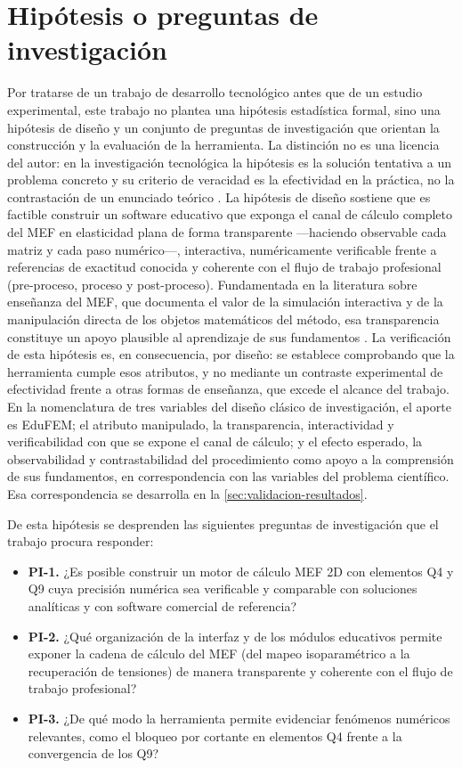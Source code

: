 \section*{Hipótesis o preguntas de investigación}

Por tratarse de un trabajo de desarrollo tecnológico antes que de un estudio experimental, este trabajo no plantea una hipótesis estadística formal, sino una hipótesis de diseño y un conjunto de preguntas de investigación que orientan la construcción y la evaluación de la herramienta. La distinción no es una licencia del autor: en la investigación tecnológica la hipótesis es la solución tentativa a un problema concreto y su criterio de veracidad es la efectividad en la práctica, no la contrastación de un enunciado teórico \autocite{garciacordoba2005tecnologica}. La hipótesis de diseño sostiene que es factible construir un software educativo que exponga el canal de cálculo completo del MEF en elasticidad plana de forma transparente —haciendo observable cada matriz y cada paso numérico—, interactiva, numéricamente verificable frente a referencias de exactitud conocida y coherente con el flujo de trabajo profesional (pre-proceso, proceso y post-proceso). Fundamentada en la literatura sobre enseñanza del MEF, que documenta el valor de la simulación interactiva y de la manipulación directa de los objetos matemáticos del método, esa transparencia constituye un apoyo plausible al aprendizaje de sus fundamentos \autocite{lee2015interactive,bishay2020teaching,perezsantiago2023fem}. La verificación de esta hipótesis es, en consecuencia, por diseño: se establece comprobando que la herramienta cumple esos atributos, y no mediante un contraste experimental de efectividad frente a otras formas de enseñanza, que excede el alcance del trabajo. En la nomenclatura de tres variables del diseño clásico de investigación, el aporte es EduFEM; el atributo manipulado, la transparencia, interactividad y verificabilidad con que se expone el canal de cálculo; y el efecto esperado, la observabilidad y contrastabilidad del procedimiento como apoyo a la comprensión de sus fundamentos, en correspondencia con las variables del problema científico. Esa correspondencia se desarrolla en la \autoref{sec:validacion-resultados}.

De esta hipótesis se desprenden las siguientes preguntas de investigación que el trabajo procura responder:

\begin{itemize}
    \item \textbf{PI-1.} ¿Es posible construir un motor de cálculo MEF 2D con elementos Q4 y Q9 cuya precisión numérica sea verificable y comparable con soluciones analíticas y con software comercial de referencia?
    \item \textbf{PI-2.} ¿Qué organización de la interfaz y de los módulos educativos permite exponer la cadena de cálculo del MEF (del mapeo isoparamétrico a la recuperación de tensiones) de manera transparente y coherente con el flujo de trabajo profesional?
    \item \textbf{PI-3.} ¿De qué modo la herramienta permite evidenciar fenómenos numéricos relevantes, como el bloqueo por cortante en elementos Q4 frente a la convergencia de los Q9?
\end{itemize}

